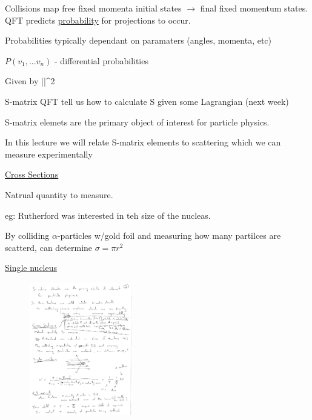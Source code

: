 {Collisions map free fixed momenta initial states $\rightarrow$ final fixed momentum states. \\

QFT predicts \underline{probability} for projections to occur. 

Probabilities typically dependant on paramaters (angles, momenta, etc) 

\begin{center}
$P(v_1, ... v_n)$ - differential probabilities
\end{center}

Given by 
\be
||^2
\ee


\be
{} \hspace{1in} \textrm{S-matrix}
\ee
QFT tell us how to calculate S given some Lagrangian (next week)

S-matrix elemets are the primary object of interest for particle physics. 

In this lecture we will relate S-matrix elements to scattering 
which we can measure experimentally

\clearpage

\underline{\underline{Cross Sections}}


Natrual quantity to measure. 

eg: Rutherford was interested in teh size of the nucleas. 

By colliding $\alpha$-particles w/gold foil and measuring how many partilces are scatterd, can determine $\sigma = \pi r^2$

\underline{Single nucleus}
\begin{figure}[h]
\centering
\includegraphics[width=0.4\textwidth]{./Scattering}
\end{figure}

}

